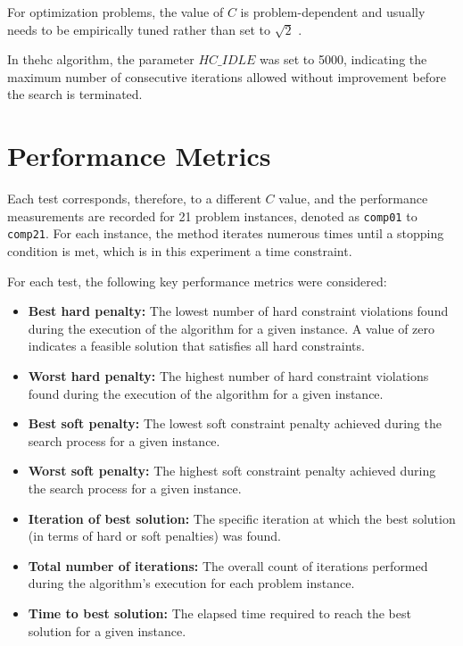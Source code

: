 For optimization problems, the value of \(C\) is problem-dependent and usually needs to be empirically tuned rather than set to \(\sqrt{2}\) \cite{swiechowski_monte_carlo_review}.

In the\ac{hc} algorithm, the parameter \(HC\_IDLE\) was set to 5000, indicating the maximum number of consecutive iterations allowed without improvement before the search is terminated.

\section{Performance Metrics}

Each test corresponds, therefore, to a different \(C\) value, and the performance measurements are recorded for 21 problem instances, denoted as \texttt{comp01} to \texttt{comp21}. For each instance, the method iterates numerous times until a stopping condition is met, which is in this experiment a time constraint.

For each test, the following key performance metrics were considered:

\begin{itemize}
\item \textbf{Best hard penalty:} The lowest number of hard constraint violations found during the execution of the algorithm for a given instance. A value of zero indicates a feasible solution that satisfies all hard constraints.

\item \textbf{Worst hard penalty:} The highest number of hard constraint violations found during the execution of the algorithm for a given instance.

\item \textbf{Best soft penalty:} The lowest soft constraint penalty achieved during the search process for a given instance.

\item \textbf{Worst soft penalty:} The highest soft constraint penalty achieved during the search process for a given instance.

\item \textbf{Iteration of best solution:} The specific iteration at which the best solution (in terms of hard or soft penalties) was found.

\item \textbf{Total number of iterations:} The overall count of iterations performed during the algorithm's execution for each problem instance.

\item \textbf{Time to best solution:} The elapsed time required to reach the best solution for a given instance.
\end{itemize}


